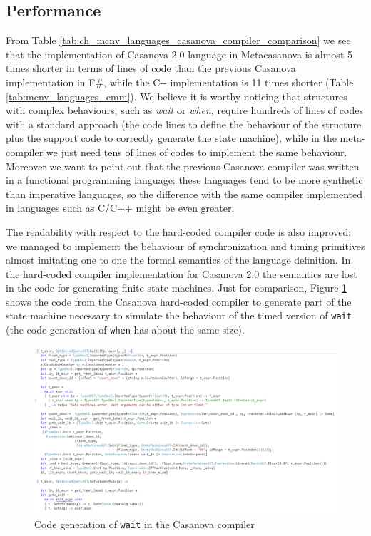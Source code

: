 \subsection{Performance}
From Table \ref{tab:ch_mcnv_languages_casanova_compiler_comparison} we see that the implementation of Casanova 2.0 language in Metacasanova is almost 5 times shorter in terms of lines of code than the previous Casanova implementation in F\#, while the C-{}- implementation is 11 times shorter (Table \ref{tab:mcnv_languages_cmm}). We believe it is worthy noticing that structures with complex behaviours, such as \textit{wait} or \textit{when}, require hundreds of lines of codes with a standard approach (the code lines to define the behaviour of the structure plus the support code to correctly generate the state machine), while in the meta-compiler we just need tens of lines of codes to implement the same behaviour. Moreover we want to point out that the previous Casanova compiler was written in a functional programming language: these languages tend to be more synthetic than imperative languages, so the difference with the same compiler implemented in languages such as C/C++ might be even greater.

The readability with respect to the hard-coded compiler code is also improved: we managed to implement the behaviour of synchronization and timing primitives almost imitating one to one the formal semantics of the language definition. In the hard-coded compiler implementation for Casanova 2.0 the semantics are lost in the code for generating finite state machines. Just for comparison, Figure \ref{fig:ch_mcnv_languages_wait_code_generation} shows the code from the Casanova hard-coded compiler to generate part of the state machine necessary to simulate the behaviour of the timed version of \texttt{wait} (the code generation of \texttt{when} has about the same size).

\begin{figure}
	\centering
	\includegraphics[width=\textwidth]{Figures/wait_code_casanova_compiler}
	\caption{Code generation of \texttt{wait} in the Casanova compiler}
	\label{fig:ch_mcnv_languages_wait_code_generation}
\end{figure}

